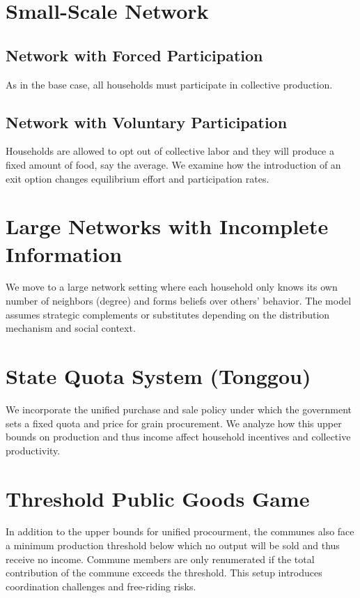\documentclass[12pt]{article}
\begin{document}
\section{Small-Scale Network}
\subsection{Network with Forced Participation}
As in the base case, all households must participate in collective production.

\subsection{Network with Voluntary Participation}
Households are allowed to opt out of collective labor and they will produce a fixed amount of food, say the average. We examine how the introduction of an exit option changes equilibrium effort and participation rates.

\section{Large Networks with Incomplete Information}
We move to a large network setting where each household only knows its own number of neighbors (degree) and forms beliefs over others' behavior. The model assumes strategic complements or substitutes depending on the distribution mechanism and social context.

\section{State Quota System (Tonggou)}
We incorporate the unified purchase and sale policy under which the government sets a fixed quota and price for grain procurement. We analyze how this upper bounds on production and thus income affect household incentives and collective productivity.

\section{Threshold Public Goods Game}
In addition to the upper bounds for unified procourment, the communes also face a minimum production threshold below which no output will be sold and thus receive no income. Commune members are only renumerated if the total contribution of the commune exceeds the threshold. This setup introduces coordination challenges and free-riding risks.
\end{document}
